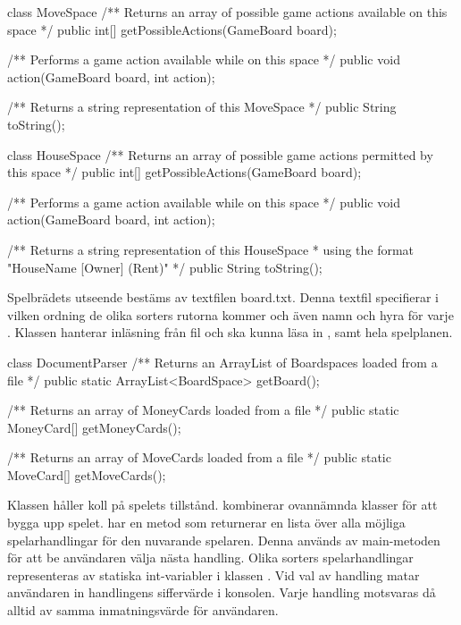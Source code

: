 \begin{JavaSpec}{class MoveSpace}
    /** Returns an array of possible game actions available on this space */
    public int[] getPossibleActions(GameBoard board);

    /** Performs a game action available while on this space */
    public void action(GameBoard board, int action);

    /** Returns a string representation of this MoveSpace */
   public String toString();
\end{JavaSpec}

\begin{JavaSpec}{class HouseSpace}
    /** Returns an array of possible game actions permitted by this space */
    public int[] getPossibleActions(GameBoard board);

    /** Performs a game action available while on this space */
    public void action(GameBoard board, int action);

    /** Returns a string representation of this HouseSpace
      * using the format "HouseName [Owner] (Rent)" */
   public String toString();
\end{JavaSpec}

Spelbrädets utseende bestäms av textfilen board.txt. Denna textfil specifierar i vilken ordning de olika sorters rutorna kommer och även namn och hyra för varje . Klassen  hanterar inläsning från fil och ska kunna läsa in ,  samt hela spelplanen. 

\begin{JavaSpec}{class DocumentParser}
	/** Returns an ArrayList of Boardspaces loaded from a file */
	public static ArrayList<BoardSpace> getBoard();

	/** Returns an array of MoneyCards loaded from a file */
	public static MoneyCard[] getMoneyCards();

	/** Returns an array of MoveCards loaded from a file */
	public static MoveCard[] getMoveCards();
\end{JavaSpec}


Klassen  håller koll på spelets tillstånd.
 kombinerar ovannämnda klasser för att bygga upp spelet.  har en metod  som returnerar en lista över alla möjliga spelarhandlingar för den nuvarande spelaren. Denna används av main-metoden för att be användaren välja nästa handling. 
Olika sorters spelarhandlingar representeras av statiska int-variabler i klassen . Vid val av handling matar användaren in handlingens siffervärde i konsolen. Varje handling motsvaras då alltid av samma inmatningsvärde för användaren.


